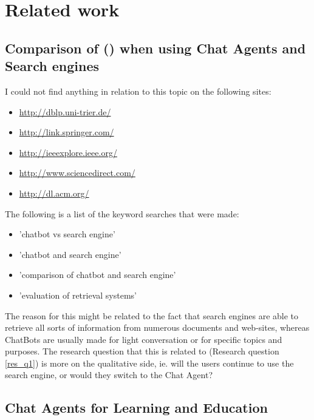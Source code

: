 \chapter{Related work}
\label{chapter3:related_work}


\section{Comparison of  () when using Chat Agents and Search engines}
\label{chapter3:chatbot_vs_search_engine}
I could not find anything in relation to this topic on the following sites:
\begin{itemize}
	\item \url{http://dblp.uni-trier.de/}
	\item \url{http://link.springer.com/}
	\item \url{http://ieeexplore.ieee.org/}
	\item \url{http://www.sciencedirect.com/}
	\item \url{http://dl.acm.org/}
\end{itemize}
The following is a list of the keyword searches that were made:
\begin{itemize}
	\item 'chatbot vs search engine'
	\item 'chatbot and search engine'
	\item 'comparison of chatbot and search engine'
	\item 'evaluation of retrieval systems' 
\end{itemize}
The reason for this might be related to the fact that search engines are able to 
retrieve all sorts of information from numerous documents and web-sites, whereas ChatBots are usually made for light conversation or for specific 
topics and purposes. The research question that this is related to (Research question \ref{res_q1}) is more on the qualitative side, ie. will the 
users continue to use the search engine, or would they switch to the Chat Agent?

\section{Chat Agents for Learning and Education}
\label{chapter3:learning_with_chatbots}


